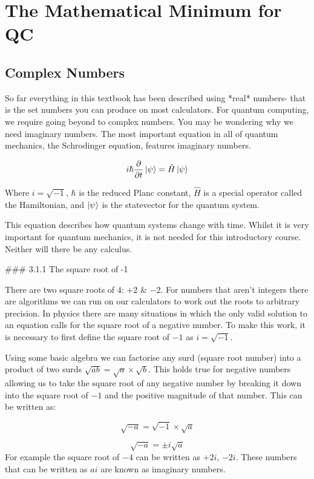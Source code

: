 \documentclass{book}
\begin{document}
\section{The Mathematical Minimum for QC}
\subsection{Complex Numbers}

So far everything in this textbook has been described using *real* numbers- that is the set numbers you can produce on most calculators. For quantum computing, we require going beyond to complex numbers. You may be wondering why we need imaginary numbers. The most important equation in all of quantum mechanics, the Schrodinger equation, features imaginary numbers. 

$$ i\hbar \frac{\partial{}}{\partial{t}}\ket{\psi} = \hat{H}\ket{\psi} $$

Where $i = \sqrt{-1}$, $\hbar$ is the reduced Planc constant, $\hat{H}$ is a special operator called the Hamiltonian, and $\ket{\psi}$ is the statevector for the quantum system. 

This equation describes how quantum systems change with time. Whilst it is very important for quantum mechanics, it is not needed for this introductory course. Neither will there be any calculus.

### 3.1.1 The square root of -1 

There are two square roots of $4$: $+2$ \& $-2$. For numbers that aren't integers there are algorithms we can run on our calculators to work out the roots to arbitrary precision. In physics there are many situations in which the only valid solution to an equation calls for the square root of a negative number. To make this work, it is necessary to first define the square root of $-1$ as $i = \sqrt{-1}$. 

Using some basic algebra we can factorise any surd (square root number) into a product of two surds $ \sqrt{ab} = \sqrt{a} \times \sqrt{b}$. This holds true for negative numbers allowing us to take the square root of any negative number by breaking it down into the square root of $-1$ and the positive magnitude of that number. This can be written as:

$$ \sqrt{-a} = \sqrt{-1} \times \sqrt{a} $$

$$ \sqrt{-a} = \pm i \sqrt{a} $$
For example the square root of $-4$ can be written as $+2i$, $-2i$.
These numbers that can be written as $ai$ are known as imaginary numbers. 
\end{document}
